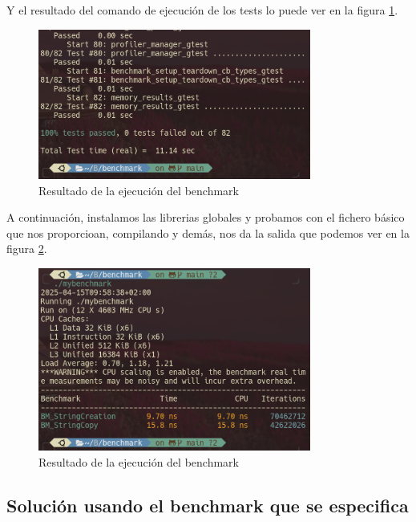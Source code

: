 Y el resultado del comando de ejecución de los tests lo puede ver en la figura \ref{fig:benchmarkResult}.

\begin{figure}[H]
    \centering
    \includegraphics[width=0.8\textwidth]{images/Bloque2/resultsBench.png}
    \caption{Resultado de la ejecución del benchmark}
    \label{fig:benchmarkResult}
\end{figure}

A continuación, instalamos las librerias globales y probamos con el fichero básico que nos proporcioan, compilando y demás, nos da la salida que podemos ver en la figura \ref{fig:benchmarkResult2}.

\begin{figure}[H]
    \centering
    \includegraphics[width=0.8\textwidth]{images/Bloque2/resultsMYBENCHMARK.png}
    \caption{Resultado de la ejecución del benchmark}
    \label{fig:benchmarkResult2}
\end{figure}

\subsection*{Solución usando el benchmark que se especifica}

